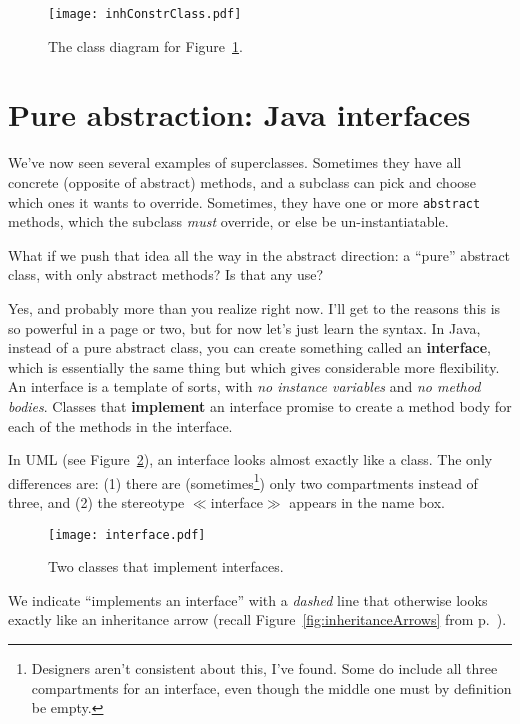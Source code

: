 \begin{figure}
\centering
\texttt{[image: inhConstrClass.pdf]}
\caption{The class diagram for Figure~\ref{fig:inhConstrCode}.}
\label{fig:inhConstrCode}
\end{figure}


\section{Pure abstraction: Java interfaces}

We've now seen several examples of superclasses. Sometimes they have all
concrete (opposite of abstract) methods, and a subclass can pick and choose
which ones it wants to override. Sometimes, they have one or more
\texttt{abstract} methods, which the subclass \textit{must} override, or else
be un-instantiatable.

What if we push that idea all the way in the abstract direction: a ``pure''
abstract class, with only abstract methods? Is that any use?

Yes, and probably more than you realize right now. I'll get to the reasons
this is so powerful in a page or two, but for now let's just learn the syntax.
In Java, instead of a pure abstract class, you can create something called an
\textbf{interface}, which is essentially the same thing but which gives
considerable more flexibility. An interface is a template of sorts, with
\textit{no instance variables} and \textit{no method bodies}. Classes that
\textbf{implement} an interface promise to create a method body for each of
the methods in the interface.

In UML (see Figure~\ref{fig:interface}), an interface looks almost exactly
like a class. The only differences are: (1) there are
(sometimes\footnote{Designers aren't consistent about this, I've found. Some
do include all three compartments for an interface, even though the middle one
must by definition be empty.}) only two compartments instead of three, and (2)
the stereotype $\ll$interface$\gg$ appears in the name box.

\begin{figure}[ht]
\centering
\texttt{[image: interface.pdf]}
\caption{Two classes that implement interfaces.}
\label{fig:interface}
\end{figure}

We indicate ``implements an interface'' with a \textit{dashed} line that
otherwise looks exactly like an inheritance arrow (recall
Figure~\ref{fig:inheritanceArrows} from p.~\pageref{page:inheritanceArrows}).

